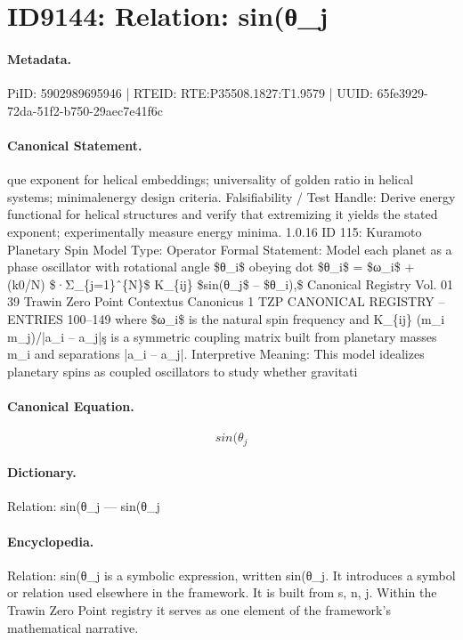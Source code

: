 \section*{ID9144: Relation: sin(θ\_j}
\paragraph{Metadata.}
PiID: 5902989695946 | RTEID: RTE:P35508.1827:T1.9579 | UUID: 65fe3929-72da-51f2-b750-29aec7e41f6c

\paragraph{Canonical Statement.}
que exponent for helical embeddings; universality of golden ratio in helical systems; minimalenergy design criteria. Falsifiability / Test Handle: Derive energy functional for helical structures and verify that extremizing it yields the stated exponent; experimentally measure energy minima. 1.0.16 ID 115: Kuramoto Planetary Spin Model Type: Operator Formal Statement: Model each planet as a phase oscillator with rotational angle \$θ\_i\$ obeying dot \$θ\_i\$ = \$ω\_i\$ + (k0/N) \$·Σ\_\{j=1\}ˆ\{N\}\$ K\_\{ij\} \$sin(θ\_j\$ – \$θ\_i),\$ Canonical Registry Vol. 01 39 Trawin Zero Point Contextus Canonicus 1 TZP CANONICAL REGISTRY – ENTRIES 100–149 where \$ω\_i\$ is the natural spin frequency and K\_\{ij\} (m\_i m\_j)/|a\_i – a\_j|ş is a symmetric coupling matrix built from planetary masses m\_i and separations |a\_i – a\_j|. Interpretive Meaning: This model idealizes planetary spins as coupled oscillators to study whether gravitati

\paragraph{Canonical Equation.}
\[
sin(θ_j
\]

\paragraph{Dictionary.}
Relation: sin(θ\_j — sin(θ\_j

\paragraph{Encyclopedia.}
Relation: sin(θ\_j is a symbolic expression, written sin(θ\_j. It introduces a symbol or relation used elsewhere in the framework. It is built from s, n, j. Within the Trawin Zero Point registry it serves as one element of the framework's mathematical narrative.
